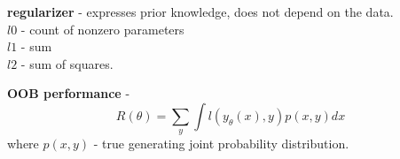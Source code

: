 \documentclass{article}
\newcommand{\para}[0]{\par\vspace{0.2cm}\noindent}
\newcommand{\define}[2]{\textbf{#1} - {#2}.  \para}
\begin{document}
\define{regularizer}{expresses prior knowledge, does not depend on the data.  \\
    $l0$ - count of nonzero parameters  \\
    $l1$ - sum  \\
    $l2$ - sum of squares}



\define{OOB performance}{
    $$R(\theta) = \sum_y \int l(y_\theta(x), y) p(x, y) dx$$
    where $p(x, y)$ - true generating joint probability distribution}
    
\end{document}
